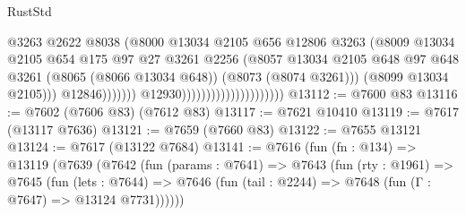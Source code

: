 \begin{lexlean}{RustStd}
\begin{coremodule}
                                                            @3263
                                                            @2622
                                                            @8038
                                                            (@8000
                                                              @13034
                                                              @2105
                                                              @656
                                                              @12806
                                                              @3263
                                                              (@8009
                                                                @13034
                                                                @2105
                                                                @654
                                                                @175
                                                                @97
                                                                @27
                                                                @3261
                                                                @2256
                                                                (@8057
                                                                  @13034
                                                                  @2105
                                                                  @648
                                                                  @97
                                                                  @648
                                                                  @3261
                                                                  (@8065 (@8066 @13034 @648))
                                                                  (@8073 (@8074 @3261)))
                                                                (@8099 @13034 @2105)))
                                                            @12846)))))))
                                              @12930)))))))))))))))))))))
@13112 := @7600 @83
@13116 := @7602 (@7606 @83) (@7612 @83)
@13117 := @7621 @10410
@13119 := @7617 (@13117 @7636)
@13121 := @7659 (@7660 @83)
@13122 := @7655 @13121
@13124 := @7617 (@13122 @7684)
@13141 := @7616
    (fun (fn : @134) =>
    @13119
      (@7639
        (@7642
          (fun (params : @7641) =>
          @7643
            (fun (rty : @1961) =>
            @7645
              (fun (lets : @7644) =>
              @7646 (fun (tail : @2244) => @7648 (fun (Γ : @7647) => @13124 @7731))))))

\end{coremodule}
\end{lexlean}
